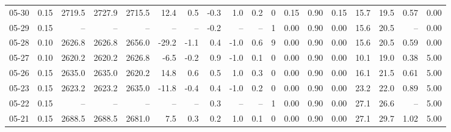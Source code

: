 \begin{threeparttable}
{\begin{tabular}{lrrrrrrrrrrrrrrrrr}
  05-30 &     0.15 & 2719.5 & 2727.9 & 2715.5 &       12.4 &            0.5 &                      -0.3 &                      1.0 &                 0.2 &              0 &       0.15 &      0.90 &           0.15 &             15.7 &                19.5 &            0.57 &                   0.00 \\
  05-29 &     0.15 &     -- &     -- &     -- &         -- &             -- &                      -0.2 &                       -- &                  -- &              1 &       0.00 &      0.90 &           0.00 &             15.6 &                20.5 &              -- &                   0.00 \\
  05-28 &     0.10 & 2626.8 & 2626.8 & 2656.0 &      -29.2 &           -1.1 &                       0.4 &                     -1.0 &                 0.6 &              9 &       0.00 &      0.90 &           0.00 &             15.6 &                20.5 &            0.59 &                   0.00 \\
  05-27 &     0.10 & 2620.2 & 2620.2 & 2626.8 &       -6.5 &           -0.2 &                       0.9 &                     -1.0 &                 0.1 &              0 &       0.00 &      0.90 &           0.00 &             10.1 &                19.0 &            0.38 &                   5.00 \\
  05-26 &     0.15 & 2635.0 & 2635.0 & 2620.2 &       14.8 &            0.6 &                       0.5 &                      1.0 &                 0.3 &              0 &       0.00 &      0.90 &           0.00 &             16.1 &                21.5 &            0.61 &                   5.00 \\
  05-23 &     0.15 & 2623.2 & 2623.2 & 2635.0 &      -11.8 &           -0.4 &                       0.4 &                     -1.0 &                 0.2 &              0 &       0.00 &      0.90 &           0.00 &             23.2 &                22.0 &            0.89 &                   5.00 \\
  05-22 &     0.15 &     -- &     -- &     -- &         -- &             -- &                       0.3 &                       -- &                  -- &              1 &       0.00 &      0.90 &           0.00 &             27.1 &                26.6 &              -- &                   5.00 \\
  05-21 &     0.15 & 2688.5 & 2688.5 & 2681.0 &        7.5 &            0.3 &                       0.2 &                      1.0 &                 0.1 &              0 &       0.00 &      0.90 &           0.00 &             27.1 &                29.7 &            1.02 &                   5.00 \\

\end{tabular}}
\end{threeparttable}
